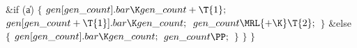 \&{if} (\|a)\5
${}\{{}$\1\6
${}\\{gen}[\\{gen\_count}].\\{bar}\K\\{gen\_count}+\T{1};{}$\6
${}\\{gen}[\\{gen\_count}+\T{1}].\\{bar}\K\\{gen\_count};{}$\6
${}\\{gen\_count}\MRL{+{\K}}\T{2};{}$\6
\4${}\}{}$\5
\2\&{else}\5
${}\{{}$\1\6
${}\\{gen}[\\{gen\_count}].\\{bar}\K\\{gen\_count};{}$\6
${}\\{gen\_count}\PP;{}$\6
\4${}\}{}$\2\6
\4${}\}{}$\2\6
\4${}\}{}$\2\par
\fi

